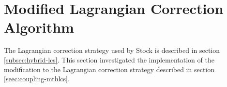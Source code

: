 %		 
%	 
%	 
%	 
%	 
%	 
	


\section{Modified Lagrangian Correction Algorithm}
\label{sec:coupling-mlca}
	The Lagrangian correction strategy used by Stock \cite{Stock2010a} is described in section \ref{subsec:hybrid-lcs}. This section investigated the implementation of the modification to the Lagrangian correction strategy described in section \ref{seec:coupling-mthlcs}.
		
